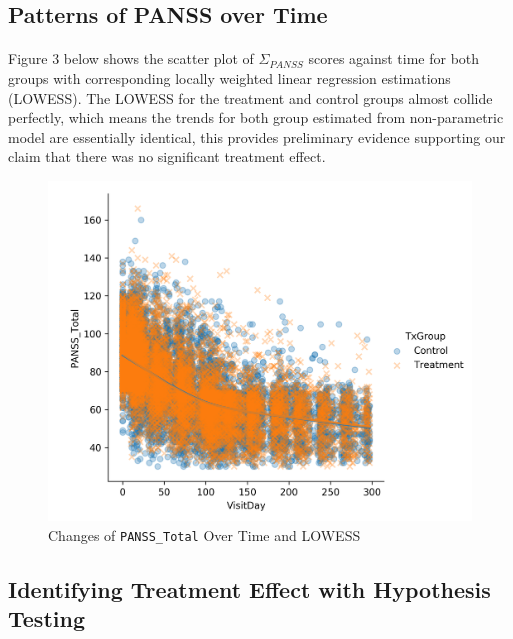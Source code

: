 \documentclass[11pt]{article}
\begin{document}
	\subsection{Patterns of PANSS over Time}
	\paragraph{}Figure 3 below shows the scatter plot of $\Sigma_{PANSS}$ scores against time for both groups with corresponding locally weighted linear regression estimations (LOWESS). The LOWESS for the treatment and control groups almost collide perfectly, which means the trends for both group estimated from non-parametric model are essentially identical, this provides preliminary evidence supporting our claim that there was no significant treatment effect.
	\begin{figure}[H]
		\centering
		\includegraphics[width=0.7\linewidth]{figures/lwlm_te_PANSS_Total.png}
		\caption{Changes of \texttt{PANSS\_Total} Over Time and LOWESS}
	\end{figure}
	\subsection{Identifying Treatment Effect with Hypothesis Testing}
\end{document}
